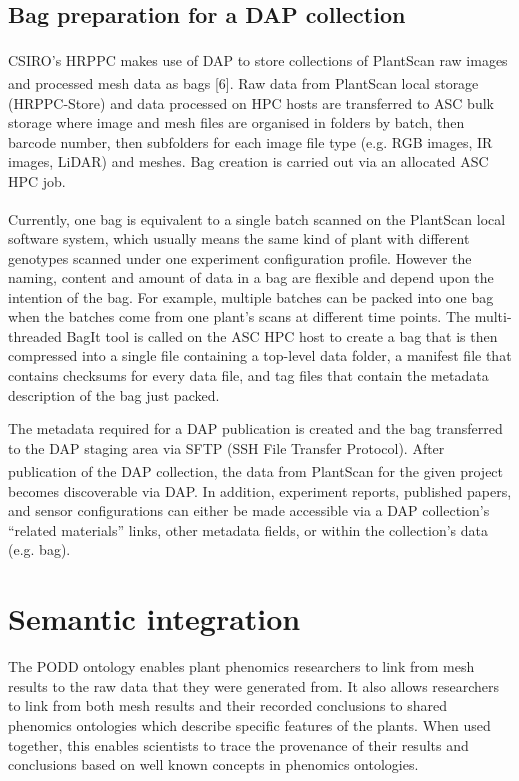\documentclass{llncs}
\begin{document}
\subsection{Bag preparation for a DAP collection}
CSIRO’s HRPPC makes use of DAP to store collections of
PlantScan\textsuperscript{\texttrademark} raw images
and processed mesh data as bags [6]. Raw data from
PlantScan\textsuperscript{\texttrademark} local storage
(HRPPC-Store) and data processed on HPC hosts are transferred to ASC bulk
storage where image and mesh files are organised in folders by batch, then
barcode number, then subfolders for each image file type (e.g. RGB images, IR
images, LiDAR) and meshes. Bag creation is carried out via an allocated ASC HPC
job.


Currently, one bag is equivalent to a single batch scanned on the
PlantScan\textsuperscript{\texttrademark}
local software system, which usually means the same kind of plant with different
genotypes scanned under one  experiment configuration profile.  However the
naming, content and amount of data in a bag are flexible and depend upon the
intention of the bag. For example, multiple batches can be packed into one bag
when the batches come from one plant’s scans at different time points. The
multi-threaded BagIt tool is called on the ASC HPC host to create a bag that is
then compressed into a single file containing a top-level data folder, a
manifest file that contains checksums for every data file, and tag files that
contain the metadata description of the bag just packed. 


The metadata required for a DAP publication is created and the bag transferred
to the DAP staging area via SFTP (SSH File Transfer Protocol). After publication
of the DAP collection, the data from PlantScan\textsuperscript{\texttrademark}
for the given project becomes
discoverable via DAP. In addition, experiment reports, published papers, and
sensor configurations can either be made accessible via a DAP collection's
``related materials'' links, other metadata fields, or within the collection's
data (e.g. bag).


\section{Semantic integration}
The PODD ontology enables plant phenomics researchers to link from mesh results
to the raw data that they were generated from. It also allows researchers to
link from both mesh results and their recorded conclusions to shared phenomics
ontologies which describe specific features of the plants. When used together,
this enables scientists to trace the provenance of their results and conclusions
based on well known concepts in phenomics ontologies.
\end{document}
